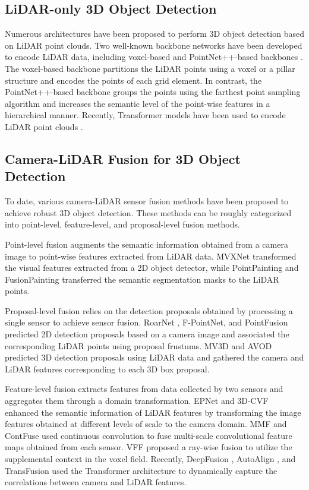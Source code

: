 \documentclass[lettersize,journal]{IEEEtran}
\begin{document}
\subsection{LiDAR-only 3D Object Detection}

Numerous architectures have been proposed to perform 3D object detection based on LiDAR point clouds. Two well-known backbone networks have been developed to encode LiDAR data, including voxel-based \cite{voxelnet,second,PointPillars} and PointNet++-based backbones \cite{pointnet++,pointrcnn,3dssd}. The voxel-based backbone partitions the LiDAR points using a voxel or a pillar structure and encodes the points of each grid element. In contrast, the PointNet++-based backbone groups the points using the farthest point sampling algorithm and increases the semantic level of the point-wise features in a hierarchical manner. 
Recently, Transformer models have been used to encode LiDAR point clouds \cite{ct3d, votr}.


\subsection{Camera-LiDAR Fusion for 3D Object Detection}
To date, various camera-LiDAR sensor fusion methods have been proposed to achieve robust 3D object detection. 
These methods can be roughly categorized into point-level, feature-level, and proposal-level fusion methods. 
 
Point-level fusion augments the semantic information obtained from a camera image to point-wise features extracted from LiDAR data. MVXNet \cite{mvxnet} transformed the visual features extracted from a 2D object detector, while PointPainting \cite{vora2020pointpainting} and FusionPainting \cite{fusionpainting} transferred the semantic segmentation masks to the LiDAR points. 



Proposal-level fusion relies on the detection proposals obtained by processing a single sensor to achieve sensor fusion.  RoarNet \cite{roarnet}, F-PointNet, \cite{fpointnet} and PointFusion \cite{pointfusion} predicted 2D detection proposals based on a camera image and associated the corresponding LiDAR points using proposal frustums. MV3D \cite{mv3d} and AVOD \cite{avod} predicted 3D detection proposals using LiDAR data and gathered the camera and LiDAR features corresponding to each 3D box proposal.  




Feature-level fusion extracts features from data collected by two sensors and aggregates them through a domain transformation. EPNet \cite{epnet} and 3D-CVF \cite{3d-cvf} enhanced the semantic information of LiDAR features by transforming the image features obtained at different levels of scale to the camera domain. MMF \cite{mmf} and ContFuse \cite{contfuse} used continuous convolution to fuse multi-scale convolutional feature maps obtained from each sensor. VFF \cite{vff} proposed a ray-wise fusion to utilize the supplemental context in the voxel field. Recently, DeepFusion \cite{deepfusion}, AutoAlign \cite{autoalign}, and TransFusion \cite{transfusion} used the Transformer architecture to dynamically capture the correlations between camera and LiDAR features.
\end{document}
